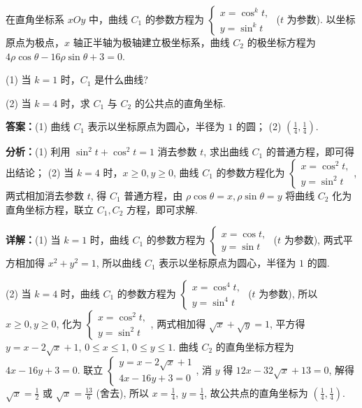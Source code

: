 \begin{question}[points=10]
在直角坐标系 $xOy$ 中，曲线 $C_1$ 的参数方程为 $\begin{cases} x = \cos^k t, \\ y = \sin^k t \end{cases}$ ($t$ 为参数). 以坐标原点为极点，$x$ 轴正半轴为极轴建立极坐标系，曲线 $C_2$ 的极坐标方程为 $4\rho\cos\theta - 16\rho\sin\theta + 3 = 0$.



(1) 当 $k=1$ 时，$C_1$ 是什么曲线?



(2) 当 $k=4$ 时，求 $C_1$ 与 $C_2$ 的公共点的直角坐标.
\begin{solution}
\textbf{答案：}(1) 曲线 $C_1$ 表示以坐标原点为圆心，半径为 $1$ 的圆； (2) $\left(\frac{1}{4}, \frac{1}{4}\right)$.

\textbf{分析：}(1) 利用 $\sin^2 t + \cos^2 t = 1$ 消去参数 $t$, 求出曲线 $C_1$ 的普通方程，即可得出结论； (2) 当 $k=4$ 时，$x\ge 0, y\ge 0$, 曲线 $C_1$ 的参数方程化为 $\begin{cases} x = \cos^2 t, \\ y = \sin^2 t \end{cases}$, 两式相加消去参数 $t$, 得 $C_1$ 普通方程，由 $\rho\cos\theta = x, \rho\sin\theta = y$ 将曲线 $C_2$ 化为直角坐标方程，联立 $C_1, C_2$ 方程，即可求解.

\textbf{详解：}(1) 当 $k=1$ 时，曲线 $C_1$ 的参数方程为 $\begin{cases} x = \cos t, \\ y = \sin t \end{cases}$ ($t$ 为参数), 两式平方相加得 $x^2+y^2=1$, 所以曲线 $C_1$ 表示以坐标原点为圆心，半径为 $1$ 的圆.

(2) 当 $k=4$ 时，曲线 $C_1$ 的参数方程为 $\begin{cases} x = \cos^4 t, \\ y = \sin^4 t \end{cases}$ ($t$ 为参数), 所以 $x\ge0, y\ge0$, 化为 $\begin{cases} x = \cos^2 t, \\ y = \sin^2 t \end{cases}$, 两式相加得 $\sqrt{x} + \sqrt{y} = 1$, 平方得 $y = x - 2\sqrt{x} + 1$, $0\le x\le 1$, $0\le y\le 1$. 曲线 $C_2$ 的直角坐标方程为 $4x - 16y + 3 = 0$. 联立 $\begin{cases} y = x - 2\sqrt{x} + 1 \\ 4x - 16y + 3 = 0 \end{cases}$, 消 $y$ 得 $12x - 32\sqrt{x} + 13 = 0$, 解得 $\sqrt{x} = \frac{1}{2}$ 或 $\sqrt{x} = \frac{13}{6}$ (舍去), 所以 $x = \frac{1}{4}$, $y = \frac{1}{4}$, 故公共点的直角坐标为 $\left(\frac{1}{4}, \frac{1}{4}\right)$.
\end{solution}
\end{question}

